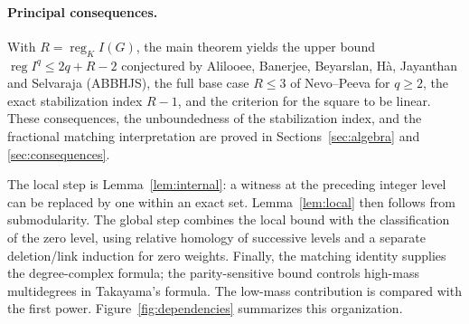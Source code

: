 \documentclass[11pt,a4paper]{article}
\theoremstyle{definition}
\newcommand{\reg}{\operatorname{reg}}
\begin{document}
\paragraph{Principal consequences.}
With $R=\reg_K I(G)$, the main theorem yields the upper bound $\reg I^q\leq2q+R-2$ conjectured by Alilooee, Banerjee, Beyarslan, H\`a, Jayanthan and Selvaraja (ABBHJS), the full base case $R\leq3$ of Nevo--Peeva for $q\geq2$, the exact stabilization index $R-1$, and the criterion for the square to be linear. These consequences, the unboundedness of the stabilization index, and the fractional matching interpretation are proved in Sections~\ref{sec:algebra} and \ref{sec:consequences}.

The local step is Lemma~\ref{lem:internal}: a witness at the preceding integer level can be replaced by one within an exact set. Lemma~\ref{lem:local} then follows from submodularity. The global step combines the local bound with the classification of the zero level, using relative homology of successive levels and a separate deletion/link induction for zero weights. Finally, the matching identity supplies the degree-complex formula; the parity-sensitive bound controls high-mass multidegrees in Takayama's formula. The low-mass contribution is compared with the first power. Figure~\ref{fig:dependencies} summarizes this organization.
\end{document}
